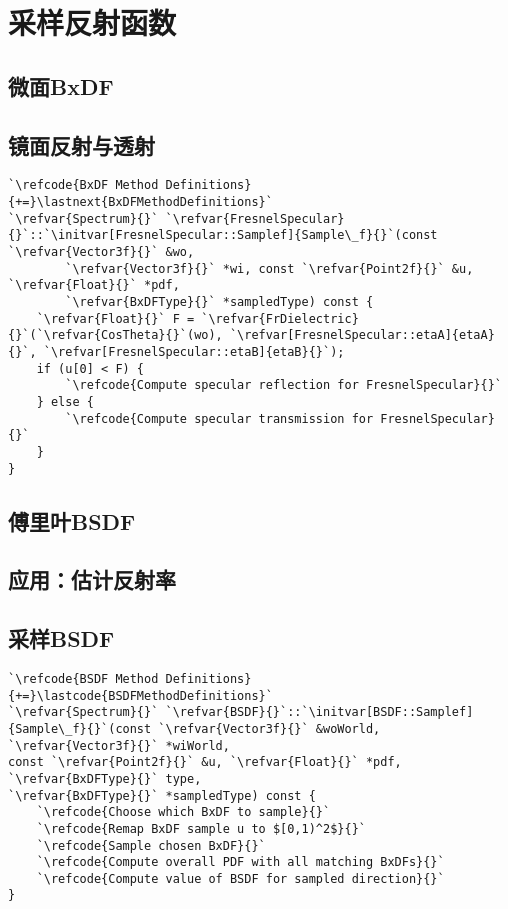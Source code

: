 \section{采样反射函数}\label{sec:采样反射函数}

\subsection{微面BxDF}\label{sub:微面BxDF}
\subsection{镜面反射与透射}\label{sub:镜面反射与透射}
\begin{lstlisting}
`\refcode{BxDF Method Definitions}{+=}\lastnext{BxDFMethodDefinitions}`
`\refvar{Spectrum}{}` `\refvar{FresnelSpecular}{}`::`\initvar[FresnelSpecular::Samplef]{Sample\_f}{}`(const `\refvar{Vector3f}{}` &wo,
        `\refvar{Vector3f}{}` *wi, const `\refvar{Point2f}{}` &u, `\refvar{Float}{}` *pdf,
        `\refvar{BxDFType}{}` *sampledType) const {
    `\refvar{Float}{}` F = `\refvar{FrDielectric}{}`(`\refvar{CosTheta}{}`(wo), `\refvar[FresnelSpecular::etaA]{etaA}{}`, `\refvar[FresnelSpecular::etaB]{etaB}{}`);
    if (u[0] < F) {
        `\refcode{Compute specular reflection for FresnelSpecular}{}`
    } else {
        `\refcode{Compute specular transmission for FresnelSpecular}{}`
    }
}
\end{lstlisting}

\subsection{傅里叶BSDF}\label{sub:傅里叶BSDF}

\subsection{应用：估计反射率}\label{sub:应用：估计反射率}
\subsection{采样BSDF}\label{sub:采样BSDF}
\begin{lstlisting}
`\refcode{BSDF Method Definitions}{+=}\lastcode{BSDFMethodDefinitions}`
`\refvar{Spectrum}{}` `\refvar{BSDF}{}`::`\initvar[BSDF::Samplef]{Sample\_f}{}`(const `\refvar{Vector3f}{}` &woWorld, `\refvar{Vector3f}{}` *wiWorld,
const `\refvar{Point2f}{}` &u, `\refvar{Float}{}` *pdf, `\refvar{BxDFType}{}` type,
`\refvar{BxDFType}{}` *sampledType) const {
    `\refcode{Choose which BxDF to sample}{}`
    `\refcode{Remap BxDF sample u to $[0,1)^2$}{}`
    `\refcode{Sample chosen BxDF}{}`
    `\refcode{Compute overall PDF with all matching BxDFs}{}`
    `\refcode{Compute value of BSDF for sampled direction}{}`
}
\end{lstlisting}